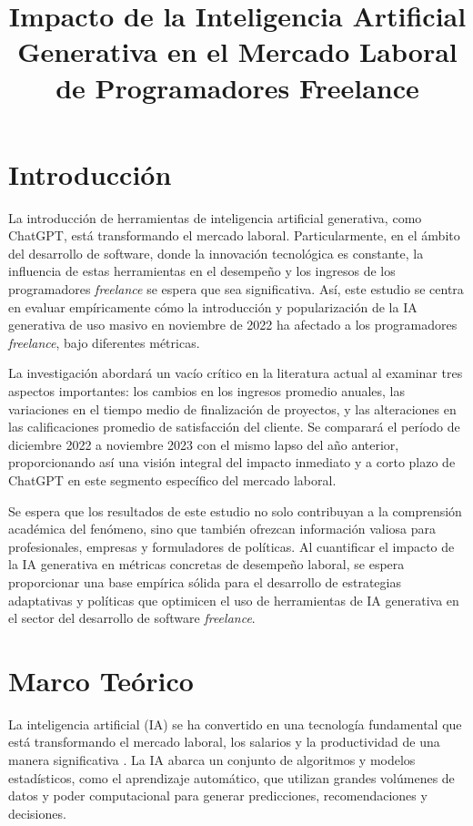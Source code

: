 \documentclass[twocolumn]{article}
\title{Impacto de la Inteligencia Artificial Generativa en el Mercado Laboral de Programadores Freelance}
\author{}
\date{}
\begin{document}
\maketitle

\section*{Introducción}
La introducción de herramientas de inteligencia artificial generativa, como ChatGPT, está transformando el mercado laboral. Particularmente, en el ámbito del desarrollo de software, donde la innovación tecnológica es constante, la influencia de estas herramientas en el desempeño y los ingresos de los programadores \emph{freelance} se espera que sea significativa. Así, este estudio se centra en evaluar empíricamente cómo la introducción y popularización de la IA generativa de uso masivo en noviembre de 2022 ha afectado a los programadores \emph{freelance}, bajo diferentes métricas.

La investigación abordará un vacío crítico en la literatura actual al examinar tres aspectos importantes: los cambios en los ingresos promedio anuales, las variaciones en el tiempo medio de finalización de proyectos, y las alteraciones en las calificaciones promedio de satisfacción del cliente. Se comparará el período de diciembre 2022 a noviembre 2023 con el mismo lapso del año anterior, proporcionando así una visión integral del impacto inmediato y a corto plazo de ChatGPT en este segmento específico del mercado laboral.

Se espera que los resultados de este estudio no solo contribuyan a la comprensión académica del fenómeno, sino que también ofrezcan información valiosa para profesionales, empresas y formuladores de políticas. Al cuantificar el impacto de la IA generativa en métricas concretas de desempeño laboral, se espera proporcionar una base empírica sólida para el desarrollo de estrategias adaptativas y políticas que optimicen el uso de herramientas de IA generativa en el sector del desarrollo de software \emph{freelance}.

\section*{Marco Teórico}
La inteligencia artificial (IA) se ha convertido en una tecnología fundamental que está transformando el mercado laboral, los salarios y la productividad de una manera significativa \parencite{frank2019}. La IA abarca un conjunto de algoritmos y modelos estadísticos, como el aprendizaje automático, que utilizan grandes volúmenes de datos y poder computacional para generar predicciones, recomendaciones y decisiones.
\end{document}
